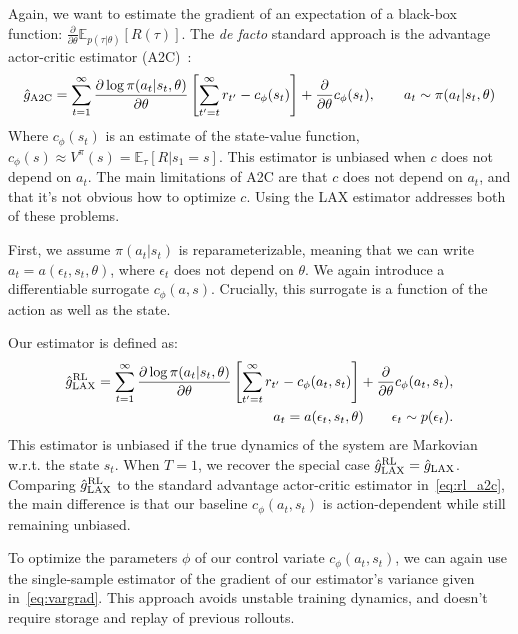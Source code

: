 \documentclass{article}
\newcommand{\E}{\mathbb{E}}
\newcommand{\LL}[1]{\frac{\partial \log \pi(a_{#1}| s_{#1}, \theta)}{\partial \theta}}
\newcommand{\PT}{\frac{\partial}{\partial \theta}}
\newcommand{\LAX}{{\textnormal{LAX}}}
\newcommand{\RL}{{\textnormal{RL}}}
\begin{document}
Again, we want to estimate the gradient of an expectation of a black-box function: $ \PT \E_{p(\tau|\theta)}[R(\tau)]$.
The \emph{de facto} standard approach is the advantage actor-critic estimator (A2C)~\citep{sutton2000policy}:
%
%
%
\begin{align}
\hat g_{\textnormal{A2C}} = \sum_{t=1}^{\infty} \LL{t} \left[ \sum_{t'=t}^{\infty} r_{t'} - c_\phi(s_t) \right]+\frac{\partial}{\partial\theta} c_\phi(s_t), \qquad a_t \sim \pi(a_t | s_t, \theta)
\label{eq:rl_a2c}
\end{align}
%
Where $c_\phi(s_t)$ is an estimate of the state-value function, $c_\phi(s) \approx V^\pi(s) = \E_{\tau}[R|s_1=s].$
This estimator is unbiased when $c$ does not depend on $a_t$.
The main limitations of A2C are that $c$ does not depend on $a_t$, and that it's not obvious how to optimize $c$.
Using the \LAX{} estimator addresses both of these problems.

First, we assume $\pi(a_t|s_t)$ is reparameterizable, meaning that we can write $a_t = a(\epsilon_t, s_t, \theta)$, where $\epsilon_t$ does not depend on $\theta$.
We again introduce a differentiable surrogate $c_\phi(a,s)$.
Crucially, this surrogate is a function of the action as well as the state.

Our estimator is defined as: 
%
\begin{align}
\hat g_\LAX^{\RL} = \sum_{t=1}^{\infty} \LL{t} \left[ \sum_{t'=t}^{\infty} r_{t'} - c_\phi(a_t,s_t) \right] +\frac{\partial}{\partial\theta} c_\phi(a_t, s_t), \\
a_t = a(\epsilon_t,s_t, \theta) \qquad \epsilon_t \sim p(\epsilon_t)\nonumber.
\label{eq:rl_est}
\end{align}
%
This estimator is unbiased if the true dynamics of the system are Markovian w.r.t. the state $s_t$.
When $T = 1$, we recover the special case ${\hat g_\LAX^{\RL} = \hat g_\LAX}$.
Comparing $\hat g_\LAX^{\RL}$ to the standard advantage actor-critic estimator in~\eqref{eq:rl_a2c}, the main difference is that our baseline $c_\phi(a_t, s_t)$ is action-dependent while still remaining unbiased.

To optimize the parameters $\phi$ of our control variate $c_\phi(a_t, s_t)$, we can again use the single-sample estimator of the gradient of our estimator's variance given in~\eqref{eq:vargrad}.
This approach avoids unstable training dynamics, and doesn't require storage and replay of previous rollouts.
\end{document}
